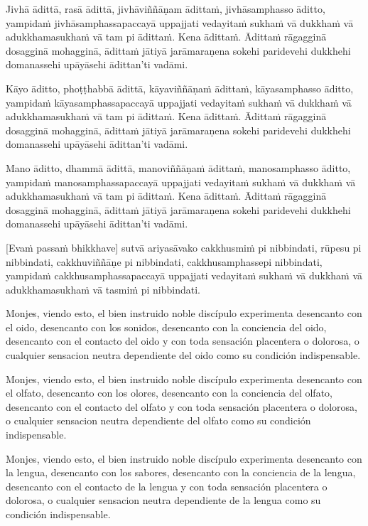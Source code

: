 Jivhā ādittā, rasā ādittā, jivhāviññāṇam ādittaṁ, jivhāsamphasso āditto,
yampidaṁ jivhāsamphassapaccayā uppajjati vedayitaṁ sukhaṁ vā dukkhaṁ vā
adukkhamasukhaṁ vā tam pi ādittaṁ. Kena ādittaṁ. Ādittaṁ rāgagginā
dosagginā mohagginā, ādittaṁ jātiyā jarāmaraṇena sokehi paridevehi
dukkhehi domanassehi upāyāsehi ādittan'ti vadāmi.

Kāyo āditto, phoṭṭhabbā ādittā, kāyaviññāṇaṁ ādittaṁ, kāyasamphasso
āditto, yampidaṁ kāyasamphassapaccayā uppajjati vedayitaṁ sukhaṁ vā
dukkhaṁ vā adukkhamasukhaṁ vā tam pi ādittaṁ. Kena ādittaṁ. Ādittaṁ
rāgagginā dosagginā mohagginā, ādittaṁ jātiyā jarāmaraṇena sokehi
paridevehi dukkhehi domanassehi upāyāsehi ādittan'ti vadāmi.

Mano āditto, dhammā ādittā, manoviññāṇaṁ ādittaṁ, manosamphasso āditto,
yampidaṁ manosamphassapaccayā uppajjati vedayitaṁ sukhaṁ vā dukkhaṁ vā
adukkhamasukhaṁ vā tam pi ādittaṁ. Kena ādittaṁ. Ādittaṁ rāgagginā
dosagginā mohagginā, ādittaṁ jātiyā jarāmaraṇena sokehi paridevehi
dukkhehi domanassehi upāyāsehi ādittan'ti vadāmi.

\enlargethispage{2\baselineskip}

[Evaṁ passaṁ bhikkhave] sutvā ariyasāvako cakkhusmiṁ pi nibbindati,
rūpesu pi nibbindati, cakkhuviññāṇe pi nibbindati, cakkhusamphassepi
nibbindati, yampidaṁ cakkhusamphassapaccayā uppajjati vedayitaṁ sukhaṁ
vā dukkhaṁ vā adukkhamasukhaṁ vā tasmiṁ pi nibbindati.

\clearpage

\englishText
\markboth{\englishTitle}{\rightmark}

Monjes, viendo esto, el bien instruido noble discípulo experimenta desencanto con el oido, desencanto con los sonidos, desencanto con la conciencia del oido, desencanto con el contacto del oido y con toda sensación placentera o dolorosa, o cualquier sensacion neutra dependiente del oido como su condición indispensable.

Monjes, viendo esto, el bien instruido noble discípulo experimenta desencanto con el olfato, desencanto con los olores, desencanto con la conciencia del olfato, desencanto con el contacto del olfato y con toda sensación placentera o dolorosa, o cualquier sensacion neutra dependiente del olfato como su condición indispensable.

Monjes, viendo esto, el bien instruido noble discípulo experimenta desencanto con la lengua, desencanto con los sabores, desencanto con la conciencia de la lengua, desencanto con el contacto de la lengua y con toda sensación placentera o dolorosa, o cualquier sensacion neutra dependiente de la lengua como su condición indispensable.

